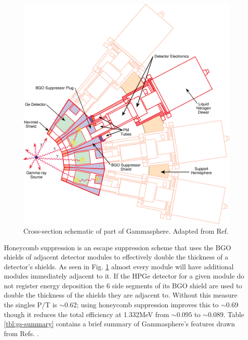 \begin{figure}[h]
	\centerline{\includegraphics[height=0.3\textheight]{./img/c3/gammasphere_detector.eps}}
	\caption{Cross-section schematic of part of Gammasphere. Adapted from Ref.\cite{gsBooklet}}
	\label{fig:chp3-gs_det_schem}
\end{figure}


Honeycomb suppression is an escape suppression scheme that uses the BGO shields of adjacent detector modules to effectively double the thickness of a detector's shields. As seen in Fig. \ref{fig:chp3-gs_det_schem} almost every module will have additional modules immediately adjacent to it. If the HPGe detector for a given module do not register energy deposition the 6 side segments of its BGO shield are used to double the thickness of the shields they are adjacent to. Without this measure the singles P/T is $\sim0.62$; using honeycomb suppression improves this to $\sim0.69$ though it reduces the total efficiency at 1.332MeV from $\sim0.095$ to $\sim0.089$\cite{TheGS}. Table \ref{tbl:gs-summary} contains a brief summary of Gammasphere's features drawn from Refs. \cite{TheGS,SimulatedResGS,GSComptonSuppression,largeArrays}.

